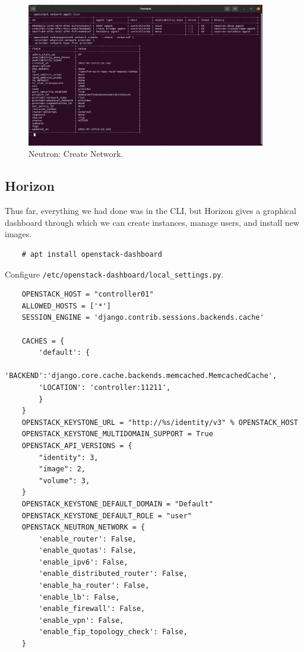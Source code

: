 \documentclass{article}
\begin{document}
\begin{figure}[ht]
    \centering
    \includegraphics[width=0.93\textwidth]{CreateNetwork.png}
    \caption{Neutron: Create Network.}
    \label{fig:CreateNetwork}
\end{figure}





\subsection{Horizon}

Thus far, everything we had done was in the CLI, but Horizon gives a graphical dashboard through which we can create instances, manage users, and install new images.

\begin{verbatim}
    # apt install openstack-dashboard
\end{verbatim}

Configure \texttt{/etc/openstack-dashboard/local\_settings.py}.

\begin{verbatim}
    OPENSTACK_HOST = "controller01"
    ALLOWED_HOSTS = ['*']
    SESSION_ENGINE = 'django.contrib.sessions.backends.cache'

    CACHES = {
        'default': {
        'BACKEND':'django.core.cache.backends.memcached.MemcachedCache',
        'LOCATION': 'controller:11211',
        }
    }
    OPENSTACK_KEYSTONE_URL = "http://%s/identity/v3" % OPENSTACK_HOST
    OPENSTACK_KEYSTONE_MULTIDOMAIN_SUPPORT = True
    OPENSTACK_API_VERSIONS = {
        "identity": 3,
        "image": 2,
        "volume": 3,
    }
    OPENSTACK_KEYSTONE_DEFAULT_DOMAIN = "Default"
    OPENSTACK_KEYSTONE_DEFAULT_ROLE = "user"
    OPENSTACK_NEUTRON_NETWORK = {
        'enable_router': False,
        'enable_quotas': False,
        'enable_ipv6': False,
        'enable_distributed_router': False,
        'enable_ha_router': False,
        'enable_lb': False,
        'enable_firewall': False,
        'enable_vpn': False,
        'enable_fip_topology_check': False,
    }
\end{verbatim}
\end{document}
